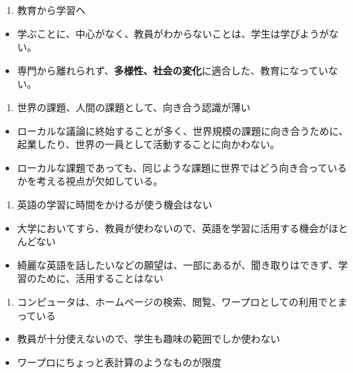 \documentclass[
]{bxjsbook}
\providecommand{\tightlist}{%
  \setlength{\itemsep}{0pt}\setlength{\parskip}{0pt}}
\theoremstyle{definition}
\theoremstyle{definition}
\theoremstyle{definition}
\theoremstyle{definition}
\theoremstyle{remark}
\begin{document}
\begin{enumerate}
\def\labelenumi{\arabic{enumi}.}
\tightlist
\item
  教育から学習へ
\end{enumerate}

\begin{itemize}
\tightlist
\item
  学ぶことに、中心がなく、教員がわからないことは、学生は学びようがない。
\item
  専門から離れられず、\textbf{多様性、社会の変化}に適合した、教育になっていない。
\end{itemize}

\begin{enumerate}
\def\labelenumi{\arabic{enumi}.}
\setcounter{enumi}{1}
\tightlist
\item
  世界の課題、人間の課題として、向き合う認識が薄い
\end{enumerate}

\begin{itemize}
\tightlist
\item
  ローカルな議論に終始することが多く、世界規模の課題に向き合うために、起業したり、世界の一員として活動することに向かわない。
\item
  ローカルな課題であっても、同じような課題に世界ではどう向き合っているかを考える視点が欠如している。
\end{itemize}

\begin{enumerate}
\def\labelenumi{\arabic{enumi}.}
\setcounter{enumi}{2}
\tightlist
\item
  英語の学習に時間をかけるが使う機会はない
\end{enumerate}

\begin{itemize}
\tightlist
\item
  大学においてすら、教員が使わないので、英語を学習に活用する機会がほとんどない
\item
  綺麗な英語を話したいなどの願望は、一部にあるが、聞き取りはできず、学習のために、活用することはない
\end{itemize}

\begin{enumerate}
\def\labelenumi{\arabic{enumi}.}
\setcounter{enumi}{3}
\tightlist
\item
  コンピュータは、ホームページの検索、閲覧、ワープロとしての利用でとまっている
\end{enumerate}

\begin{itemize}
\tightlist
\item
  教員が十分使えないので、学生も趣味の範囲でしか使わない
\item
  ワープロにちょっと表計算のようなものが限度
\end{itemize}
\end{document}
